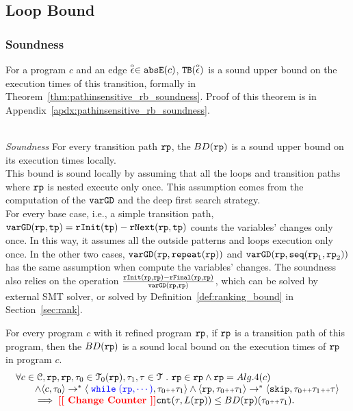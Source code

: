 \subsection{Loop Bound}

\subsubsection{Soundness}
  For a program $c$ and an edge $\stackrel{\scriptscriptstyle{\alpha}}{\mathtt{\epsilon}{}} \in \mathtt{abs}{\mathtt{E}}(c)$,
  ${\mathtt{TB}}(\stackrel{\scriptscriptstyle{\alpha}}{\mathtt{\epsilon}{}})$ is a sound upper bound
  on the execution times of this transition,
  formally in Theorem~\ref{thm:pathinsensitive_rb_soundness}. 
  Proof of this theorem is in Appendix~\ref{apdx:pathinsensitive_rb_soundness}.

\\
\emph{Soundness} For every transition path $\mathtt{rp}$, the $BD(\mathtt{rp})$
is a sound upper bound on its execution times locally.
\\
This bound is sound locally by assuming
that all the loops and transition paths where $\mathtt{rp}$ is nested execute only once.
This assumption comes from the computation of the $\mathtt{varGD}$ and the deep first search strategy.
\\
For every base case, i.e., a simple transition path, 
$\mathtt{varGD}(\mathtt{rp}, \mathtt{tp}) =  \mathtt{rInit}(\mathtt{tp}) - \mathtt{rNext}(\mathtt{rp}, \mathtt{tp})$
counts the variables' changes only once. In this way, it assumes all the outside patterns and loops execution only once.
In the other two cases,  $\mathtt{varGD}(\mathtt{rp}, \mathtt{repeat}(\mathtt{rp}))$ and $\mathtt{varGD}(\mathtt{rp}, \mathtt{seq}(\mathtt{rp}_1, \mathtt{rp}_2))$
has the same assumption when compute the variables' changes.
The soundness also relies on the operation $\frac{\mathtt{rInit}(\mathtt{rp}, \mathtt{rp}) - \mathtt{rFinal}(\mathtt{rp}, \mathtt{rp})}{\mathtt{varGD}(\mathtt{rp}, \mathtt{rp})}$,
which can be solved by external SMT solver,
or solved by Definition~\ref{def:ranking_bound} in Section~\ref{sec:rank}.
%
\begin{thm}
  \label{thm:sound_outsidein}
  For every program $c$ with it refined program $\mathtt{rp}$,
  if $\mathtt{rp}$ is a transition path of this program, then the $BD(\mathtt{rp})$
is a sound local bound on the execution times of $\mathtt{rp}$ in program $c$.
  \[
    \begin{array}{l}
    \forall c \in \cdom, \rprog, \rprog, \trace_0 \in \tdom_0(\rprog), \trace_1, \trace \in \tdom \st 
    \rprog \in \rprog \land
    \rprog = Alg.4(c)
    \\ \qquad
    \land
    \config{c, \trace_0} \to^* \config{\highlight{\ewhile (\rprog, \cdots)}, \trace_0 \tracecat \trace_1} 
    \land 
    \config{\rprog, \trace_0 \tracecat \trace_1} \to^* \config{{\eskip, \trace_0 \tracecat \trace_1 \tracecat \trace}}
    \\ \qquad
    \implies
    \todo{Change Counter}
    {\vcounter(\trace, L(\rprog))} \leq BD(\rprog)(\trace_0 \tracecat \trace_1).
    \end{array}
    \]
\end{thm}

